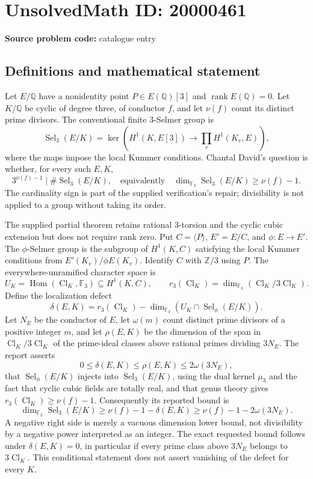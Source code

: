 \documentclass[11pt]{article}
\newcommand{\Z}{\mathbb{Z}}
\newcommand{\Q}{\mathbb{Q}}
\newcommand{\F}{\mathbb{F}}
\begin{document}
\section*{UnsolvedMath ID: 20000461}
\textbf{Source problem code:} catalogue entry
\subsection{Definitions and mathematical statement}
Let \(E/\Q\) have a nonidentity point \(P\in E(\Q)[3]\) and \(\operatorname{rank}E(\Q)=0\). Let \(K/\Q\) be cyclic of degree three, of conductor \(f\), and let \(\nu(f)\) count its distinct prime divisors. The conventional finite \(3\)-Selmer group is
\[
 \operatorname{Sel}_3(E/K)=\ker\left(H^1(K,E[3])\longrightarrow
 \prod_vH^1(K_v,E)\right),
\]
where the maps impose the local Kummer conditions. Chantal David's question is whether, for every such \(E,K\),
\[
 3^{\nu(f)-1}\mid\#\operatorname{Sel}_3(E/K),
 \quad\text{equivalently}\quad
 \dim_{\F_3}\operatorname{Sel}_3(E/K)\ge\nu(f)-1.
\]
The cardinality sign is part of the supplied verification's repair; divisibility is not applied to a group without taking its order.

The supplied partial theorem retains rational \(3\)-torsion and the cyclic cubic extension but does not require rank zero. Put \(C=\langle P\rangle\), \(E'=E/C\), and \(\phi:E\to E'\). The \(\phi\)-Selmer group is the subgroup of \(H^1(K,C)\) satisfying the local Kummer conditions from \(E'(K_v)/\phi E(K_v)\). Identify \(C\) with \(\Z/3\) using \(P\). The everywhere-unramified character space is
\[
 U_K=\operatorname{Hom}(\operatorname{Cl}_K,\F_3)\subseteq H^1(K,C),\qquad
 r_3(\operatorname{Cl}_K)=\dim_{\F_3}(\operatorname{Cl}_K/3\operatorname{Cl}_K).
\]
Define the localization defect
\[
 \delta(E,K)=r_3(\operatorname{Cl}_K)
 -\dim_{\F_3}(U_K\cap\operatorname{Sel}_\phi(E/K)).
\]
Let \(N_E\) be the conductor of \(E\), let \(\omega(m)\) count distinct prime divisors of a positive integer \(m\), and let \(\rho(E,K)\) be the dimension of the span in \(\operatorname{Cl}_K/3\operatorname{Cl}_K\) of the prime-ideal classes above rational primes dividing \(3N_E\). The report asserts
\[
 0\le\delta(E,K)\le\rho(E,K)\le2\omega(3N_E),
\]
that \(\operatorname{Sel}_\phi(E/K)\) injects into \(\operatorname{Sel}_3(E/K)\), using the dual kernel \(\mu_3\) and the fact that cyclic cubic fields are totally real, and that genus theory gives \(r_3(\operatorname{Cl}_K)\ge\nu(f)-1\). Consequently its reported bound is
\[
 \dim_{\F_3}\operatorname{Sel}_3(E/K)
 \ge\nu(f)-1-\delta(E,K)
 \ge\nu(f)-1-2\omega(3N_E).
\]
A negative right side is merely a vacuous dimension lower bound, not divisibility by a negative power interpreted as an integer. The exact requested bound follows under \(\delta(E,K)=0\), in particular if every prime class above \(3N_E\) belongs to \(3\operatorname{Cl}_K\). This conditional statement does not assert vanishing of the defect for every \(K\).
\end{document}
